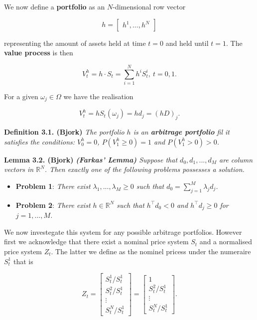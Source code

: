 \documentclass[a4paper,12pt,openany]{book}
\providecommand{\tightlist}{%
 \setlength{\itemsep}{0pt}\setlength{\parskip}{0pt}}
\begin{document}
We now define a \textbf{portfolio} as an \(N\)-dimensional row vector

\[
h=\begin{bmatrix} h^1, \dots,h^N\end{bmatrix}
\]

representing the amount of assets held at time \(t=0\) and held until \(t=1\). The \textbf{value process} is then

\[
V^h_t=h\cdot S_t=\sum_{i=1}^N h^iS_t^i,\ t=0,1.\tag{3.1}
\]

For a given \(\omega_j\in\Omega\) we have the realisation

\[
V_t^h=hS_t(\omega_j)=hd_j=(hD)_j.
\]

\textbf{Definition 3.1. (Bjork)} \emph{The portfolio \(h\) is an \textbf{arbitrage portfolio} fil it satisfies the conditions: \(V_0^h=0\), \(P(V_1^h\ge 0)=1\) and \(P(V_1^h>0)>0\).}

\textbf{Lemma 3.2. (Bjork)} \emph{\textbf{(Farkas' Lemma)} Suppose that \(d_0,d_1,...,d_M\) are column vectors in \(\mathbb{R}^N\). Then exactly one of the following problems possesses a solution.}

\begin{itemize}
\tightlist
\item
  \textbf{Problem 1}: \emph{There exist \(\lambda_1,...,\lambda_M\ge0\) such that \(d_0=\sum_{j=1}^M\lambda_jd_j\).}
\item
  \textbf{Problem 2}: \emph{There exist \(h\in\mathbb{R}^N\) such that \(h^\top d_0<0\) and \(h^\top d_j\ge 0\) for \(j=1,...,M\).}
\end{itemize}

We now investegate this system for any possible arbitrage portfolios. However first we acknowledge that there exist a nominal price system \(S_t\) and a normalised price system \(Z_t\). The latter we define as the nominel pricess under the numeraire \(S_t^1\) that is

\[
Z_t=\begin{bmatrix} S_t^1/S_t^1\\
S_t^2/S_t^1\\
\vdots\\
S_t^N/S_t^1\end{bmatrix}=\begin{bmatrix} 1\\
S_t^2/S_t^1\\
\vdots\\
S_t^N/S_t^1\end{bmatrix}.
\]
\end{document}
